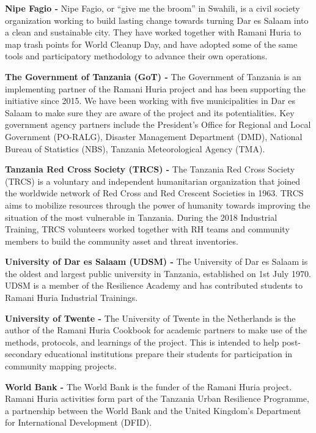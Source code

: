 \documentclass[a4paper,12pt,twoside]{article}
\begin{document}
\begin{multicols}
\textbf{Nipe Fagio -} Nipe Fagio, or “give me the broom” in Swahili, is a civil society organization working to build lasting change towards turning Dar es Salaam into a clean and sustainable city. They have worked together with Ramani Huria to map trash points for World Cleanup Day, and have adopted some of the same tools and participatory methodology to advance their own operations. 


\textbf{The Government of Tanzania (GoT) -} The Government of Tanzania is an implementing partner of the Ramani Huria project and has been supporting the initiative since 2015. We have been working with five municipalities in Dar es Salaam to make sure they are aware of the project and its potentialities. Key government agency partners include the President’s Office for Regional and Local Government (PO-RALG), Disaster Management Department (DMD), National Bureau of Statistics (NBS), Tanzania Meteorological Agency (TMA).

\textbf{Tanzania Red Cross Society (TRCS) -} The Tanzania Red Cross Society (TRCS) is a voluntary and independent humanitarian organization that joined the worldwide network of Red Cross and Red Crescent Societies in 1963. TRCS aims to mobilize resources through the power of humanity towards improving the situation of the most vulnerable in Tanzania. During the 2018 Industrial Training, TRCS volunteers worked together with RH teams and community members to build the community asset and threat inventories.

\textbf{University of Dar es Salaam (UDSM) -} The University of Dar es Salaam is the oldest and largest public university in Tanzania, established on 1st July 1970. UDSM is a member of the Resilience Academy and has contributed students to Ramani Huria Industrial Trainings. 

\textbf{University of Twente -} The University of Twente in the Netherlands is the author of the Ramani Huria Cookbook for academic partners to make use of the methods, protocols, and learnings of the project. This is intended to help post-secondary educational institutions prepare their students for participation in community mapping projects. 

\textbf{World Bank -} The World Bank is the funder of the Ramani Huria project. Ramani Huria activities form part of the Tanzania Urban Resilience Programme, a partnership between the World Bank and the United Kingdom’s Department for International Development (DFID).
\end{multicols}
\end{document}
